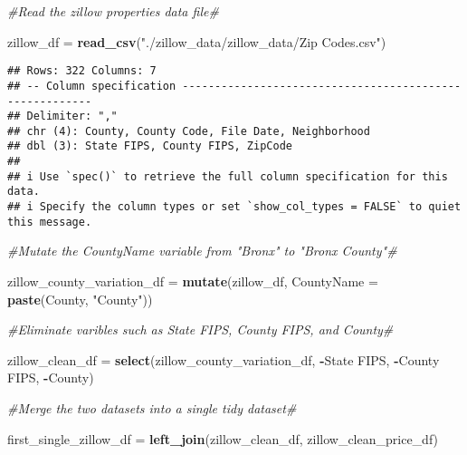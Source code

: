 \documentclass[
]{article}
\newenvironment{Shaded}{\begin{snugshade}}{\end{snugshade}}
\newcommand{\AttributeTok}[1]{\textcolor[rgb]{0.13,0.29,0.53}{#1}}
\newcommand{\CommentTok}[1]{\textcolor[rgb]{0.56,0.35,0.01}{\textit{#1}}}
\newcommand{\FunctionTok}[1]{\textcolor[rgb]{0.13,0.29,0.53}{\textbf{#1}}}
\newcommand{\NormalTok}[1]{#1}
\newcommand{\OtherTok}[1]{\textcolor[rgb]{0.56,0.35,0.01}{#1}}
\newcommand{\SpecialCharTok}[1]{\textcolor[rgb]{0.81,0.36,0.00}{\textbf{#1}}}
\newcommand{\StringTok}[1]{\textcolor[rgb]{0.31,0.60,0.02}{#1}}
\begin{document}
\begin{Shaded}
\begin{Highlighting}[]
\CommentTok{\#Read the zillow properties data file\#}

\NormalTok{zillow\_df }\OtherTok{=} \FunctionTok{read\_csv}\NormalTok{(}\StringTok{"./zillow\_data/zillow\_data/Zip Codes.csv"}\NormalTok{)}
\end{Highlighting}
\end{Shaded}

\begin{verbatim}
## Rows: 322 Columns: 7
## -- Column specification --------------------------------------------------------
## Delimiter: ","
## chr (4): County, County Code, File Date, Neighborhood
## dbl (3): State FIPS, County FIPS, ZipCode
## 
## i Use `spec()` to retrieve the full column specification for this data.
## i Specify the column types or set `show_col_types = FALSE` to quiet this message.
\end{verbatim}

\begin{Shaded}
\begin{Highlighting}[]
\CommentTok{\#Mutate the CountyName variable from "Bronx" to "Bronx County"\#}

\NormalTok{zillow\_county\_variation\_df }\OtherTok{=} \FunctionTok{mutate}\NormalTok{(zillow\_df, }\AttributeTok{CountyName =} \FunctionTok{paste}\NormalTok{(County, }\StringTok{"County"}\NormalTok{))}

\CommentTok{\#Eliminate varibles such as State FIPS, County FIPS, and County\#}

\NormalTok{zillow\_clean\_df }\OtherTok{=} \FunctionTok{select}\NormalTok{(zillow\_county\_variation\_df, }\SpecialCharTok{{-}}\StringTok{\textasciigrave{}}\AttributeTok{State FIPS}\StringTok{\textasciigrave{}}\NormalTok{, }\SpecialCharTok{{-}}\StringTok{\textasciigrave{}}\AttributeTok{County FIPS}\StringTok{\textasciigrave{}}\NormalTok{, }\SpecialCharTok{{-}}\NormalTok{County)}
\end{Highlighting}
\end{Shaded}

\begin{Shaded}
\begin{Highlighting}[]
\CommentTok{\#Merge the two datasets into a single tidy dataset\#}

\NormalTok{first\_single\_zillow\_df }\OtherTok{=} \FunctionTok{left\_join}\NormalTok{(zillow\_clean\_df, zillow\_clean\_price\_df)}
\end{Highlighting}
\end{Shaded}
\end{document}
